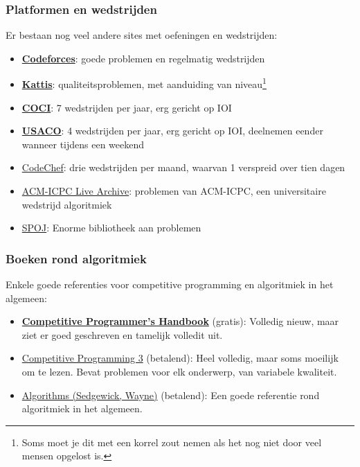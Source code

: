 \documentclass[12pt]{beamer}
\newcommand{\hrefb}[2]{{\color{linkblue}\href{#1}{#2}}}
\begin{document}
\begin{frame}
\frametitle{Platformen en wedstrijden}
Er bestaan nog veel andere sites met oefeningen en wedstrijden:
\begin{itemize}
\item \textbf{\hrefb{http://codeforces.com/}{Codeforces}}: goede problemen en regelmatig wedstrijden
\item \textbf{\hrefb{https://open.kattis.com/}{Kattis}}: qualiteitsproblemen, met aanduiding van niveau\footnote{Soms moet je dit met een korrel zout nemen als het nog niet door veel mensen opgelost is.}
\item \textbf{\hrefb{http://hsin.hr/coci/}{COCI}}: 7 wedstrijden per jaar, erg gericht op IOI
\item \textbf{\hrefb{http://usaco.org}{USACO}}: 4 wedstrijden per jaar, erg gericht op IOI, deelnemen eender wanneer tijdens een weekend
\item \hrefb{https://www.codechef.com/}{CodeChef}: drie wedstrijden per maand, waarvan 1 verspreid over tien dagen
\item \hrefb{https://icpcarchive.ecs.baylor.edu/}{ACM-ICPC Live Archive}: problemen van ACM-ICPC, een universitaire wedstrijd algoritmiek
\item \hrefb{http://www.spoj.com/}{SPOJ}: Enorme bibliotheek aan problemen
\end{itemize}
\end{frame}

\begin{frame}
\frametitle{Boeken rond algoritmiek}
Enkele goede referenties voor competitive programming en algoritmiek in het algemeen:
\begin{itemize}
\item \textbf{\hrefb{https://cses.fi/book.html}{Competitive Programmer's Handbook}} (gratis): Volledig nieuw, maar ziet er goed geschreven en tamelijk volledit uit.
\item \hrefb{https://cpbook.net}{Competitive Programming 3} (betalend): Heel volledig, maar soms moeilijk om te lezen. Bevat problemen voor elk onderwerp, van variabele kwaliteit.
\item \hrefb{http://algs4.cs.princeton.edu/home/}{Algorithms (Sedgewick, Wayne)} (betalend): Een goede referentie rond algoritmiek in het algemeen.
\end{itemize}
\end{frame}
\end{document}

